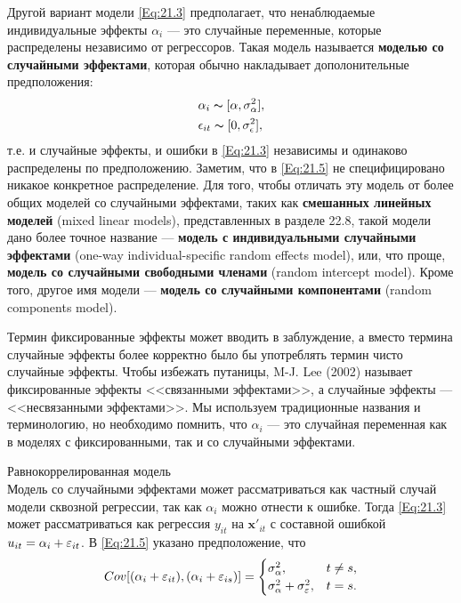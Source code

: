 Другой вариант модели \ref{Eq:21.3} предполагает, что ненаблюдаемые индивидуальные эффекты $\alpha_i$ --- это случайные переменные, которые распределены независимо от регрессоров. Такая модель называется \textbf{моделью со случайными эффектами}, которая обычно накладывает дополонительные предположения:
\begin{align}
 & \alpha_i  \thicksim [\alpha, \sigma^2_{\alpha}],  \\ 
\label{Eq:21.5}
& \epsilon_{it}  \thicksim [0, \sigma^2_{\epsilon}], \nonumber
\end{align}
т.е. и случайные эффекты, и ошибки в \ref{Eq:21.3} независимы и одинаково распределены по предположению. Заметим, что в  \ref{Eq:21.5} не специфицировано никакое конкретное распределение. Для того, чтобы отличать эту модель от более общих моделей со случайными эффектами, таких как \textbf{смешанных линейных моделей} (mixed linear models), представленных в разделе 22.8, такой модели дано более точное название  --- \textbf{модель с индивидуальными случайными эффектами} (one-way individual-specific random effects model), или, что проще, \textbf{модель со случайными свободными членами} (random intercept model). Кроме того, другое имя модели --- \textbf{модель со случайными компонентами} (random components model). 

Термин фиксированные эффекты может вводить в заблуждение, а вместо термина случайные эффекты более корректно было бы употреблять термин чисто случайные эффекты. Чтобы избежать путаницы, M-J. Lee (2002)  называет фиксированные эффекты <<связанными эффектами>>, а случайные эффекты --- <<несвязанными эффектами>>. Мы используем традиционные названия и терминологию, но необходимо помнить, что $\alpha_i$  --- это случайная переменная как в моделях с фиксированными, так и со случайными эффектами.


{\centering
Равнокоррелированная модель\\}
Модель со случайными эффектами может рассматриваться как частный случай модели сквозной регрессии, так как $\alpha_i$ можно отнести к ошибке. Тогда \ref{Eq:21.3} может рассматриваться как регрессия $y_{it}$ на $\mathbf x'_{it}$ с составной ошибкой $u_{it}=\alpha_i+\varepsilon_{it}$. В \ref{Eq:21.5} указано предположение, что 
\begin{align}
Cov[(\alpha_i+\varepsilon_{it}), (\alpha_i+\varepsilon_{is})]= 
	\begin{cases}
		\sigma^2_{\alpha}, & t\neq s, \\
		\sigma^2_{\alpha} + \sigma^2_{\varepsilon}, & t=s.
	\end{cases}
\end{align}

